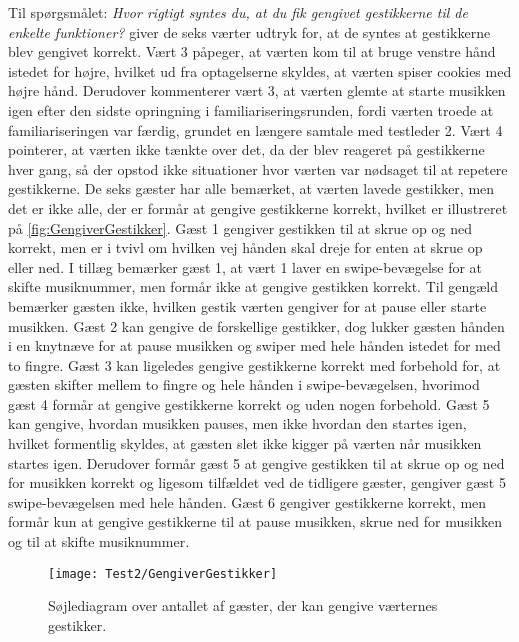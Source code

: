 Til spørgsmålet: \textit{Hvor rigtigt syntes du, at du fik gengivet gestikkerne til de enkelte funktioner?} giver de seks værter udtryk for, at de syntes at gestikkerne blev gengivet korrekt. Vært 3 påpeger, at værten kom til at bruge venstre hånd istedet for højre, hvilket ud fra optagelserne skyldes, at værten spiser cookies med højre hånd. Derudover kommenterer vært 3, at værten glemte at starte musikken igen efter den sidste opringning i familiariseringsrunden, fordi værten troede at familiariseringen var færdig, grundet en længere samtale med testleder 2. Vært 4 pointerer, at værten ikke tænkte over det, da der blev reageret på gestikkerne hver gang, så der opstod ikke situationer hvor værten var nødsaget til at repetere gestikkerne. \blankline
%
De seks gæster har alle bemærket, at værten lavede gestikker, men det er ikke alle, der er formår at gengive gestikkerne korrekt, hvilket er illustreret på \autoref{fig:GengiverGestikker}. Gæst 1 gengiver gestikken til at skrue op og ned korrekt, men er i tvivl om hvilken vej hånden skal dreje for enten at skrue op eller ned. I tillæg bemærker gæst 1, at vært 1 laver en swipe-bevægelse for at skifte musiknummer, men formår ikke at gengive gestikken korrekt. Til gengæld bemærker gæsten ikke, hvilken gestik værten gengiver for at pause eller starte musikken. Gæst 2 kan gengive de forskellige gestikker, dog lukker gæsten hånden i en knytnæve for at pause musikken og swiper med hele hånden istedet for med to fingre. Gæst 3 kan ligeledes gengive gestikkerne korrekt med forbehold for, at gæsten skifter mellem to fingre og hele hånden i swipe-bevægelsen, hvorimod gæst 4 formår at gengive gestikkerne korrekt og uden nogen forbehold. Gæst 5 kan gengive, hvordan musikken pauses, men ikke hvordan den startes igen, hvilket formentlig skyldes, at gæsten slet ikke kigger på værten når musikken startes igen. Derudover formår gæst 5 at gengive gestikken til at skrue op og ned for musikken korrekt og ligesom tilfældet ved de tidligere gæster, gengiver gæst 5 swipe-bevægelsen med hele hånden. Gæst 6 gengiver gestikkerne korrekt, men formår kun at gengive gestikkerne til at pause musikken, skrue ned for musikken og til at skifte musiknummer. 
%
\begin{figure}[H]
	\centering
	\texttt{[image: Test2/GengiverGestikker]}
	\caption{Søjlediagram over antallet af gæster, der kan gengive værternes gestikker.}
	\label{fig:GengiverGestikker}
\end{figure}
\noindent
% 
